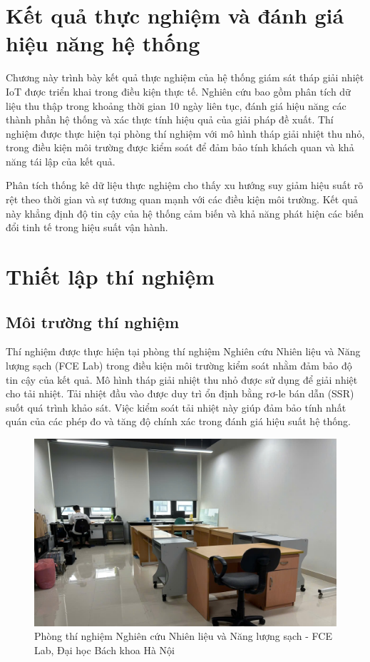 \documentclass[../main.tex]{subfiles}
\begin{document}
\section{Kết quả thực nghiệm và đánh giá hiệu năng hệ thống}
\label{sec:experimental_results}

Chương này trình bày kết quả thực nghiệm của hệ thống giám sát tháp giải nhiệt IoT được triển khai trong điều kiện thực tế. Nghiên cứu bao gồm phân tích dữ liệu thu thập trong khoảng thời gian 10 ngày liên tục, đánh giá hiệu năng các thành phần hệ thống và xác thực tính hiệu quả của giải pháp đề xuất. Thí nghiệm được thực hiện tại phòng thí nghiệm với mô hình tháp giải nhiệt thu nhỏ, trong điều kiện môi trường được kiểm soát để đảm bảo tính khách quan và khả năng tái lập của kết quả.

Phân tích thống kê dữ liệu thực nghiệm cho thấy xu hướng suy giảm hiệu suất rõ rệt theo thời gian và sự tương quan mạnh với các điều kiện môi trường. Kết quả này khẳng định độ tin cậy của hệ thống cảm biến và khả năng phát hiện các biến đổi tinh tế trong hiệu suất vận hành.

\section{Thiết lập thí nghiệm}
\label{sec:experimental_setup}

\subsection{Môi trường thí nghiệm}
\label{sec:test_environment}

Thí nghiệm được thực hiện tại phòng thí nghiệm Nghiên cứu Nhiên liệu và Năng lượng sạch (FCE Lab) trong điều kiện môi trường kiểm soát nhằm đảm bảo độ tin cậy của kết quả. Mô hình tháp giải nhiệt thu nhỏ được sử dụng để giải nhiệt cho tải nhiệt. Tải nhiệt đầu vào được duy trì ổn định bằng rơ-le bán dẫn (SSR) suốt quá trình khảo sát. Việc kiểm soát tải nhiệt này giúp đảm bảo tính nhất quán của các phép đo và tăng độ chính xác trong đánh giá hiệu suất hệ thống.

\begin{figure}
    \centering
    \includegraphics[width=1\textwidth]{Hinhve/fcelab.jpg}
    \caption{Phòng thí nghiệm Nghiên cứu Nhiên liệu và Năng lượng sạch - FCE Lab, Đại học Bách khoa Hà Nội}
    \label{fig:fcelab}
\end{figure}
\end{document}
